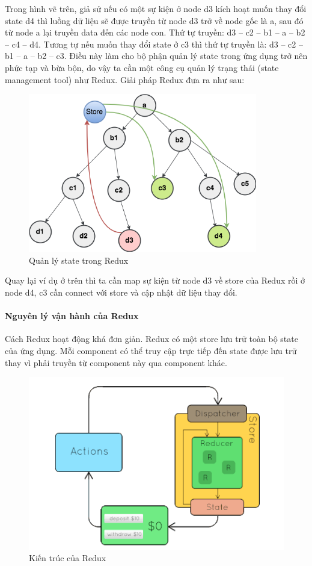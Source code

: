 Trong hình vẽ trên, giả sử nếu có một sự kiện ở node d3 kích
hoạt muốn thay đổi state d4 thì luồng dữ liệu sẽ được truyền
từ node d3 trở về node gốc là a, sau đó từ node a lại truyền data
đến các node con. Thứ tự truyền: d3 – c2 – b1 – a – b2 – c4 – d4.
Tương tự nếu muốn thay đổi state ở c3 thì thứ tự truyền là:
d3 – c2 – b1 – a – b2 – c3. Điều này làm cho bộ phận quản lý
state trong ứng dụng trở nên phức tạp và bừa bộn, do vậy ta
cần một công cụ quản lý trạng thái (state management tool)
như Redux. Giải pháp Redux đưa ra như sau:

\begin{figure}[H]
\centering
\includegraphics[width=10cm]{images/redux-solution.png}
\caption{Quản lý state trong Redux}
\end{figure}

Quay lại ví dụ ở trên thì ta cần map sự kiện từ node d3
về store của Redux rồi ở node d4, c3 cần connect với store
và cập nhật dữ liệu thay đổi.

\paragraph{Nguyên lý vận hành của Redux}
Cách Redux hoạt động khá đơn giản. Redux có một store lưu trữ
toàn bộ state của ứng dụng. Mỗi component có thể truy cập trực
tiếp đến state được lưu trữ thay vì phải truyền từ component
này qua component khác.

\begin{figure}[H]
\centering
\includegraphics[width=12cm]{images/redux-without-middleware.png}
\caption{Kiến trúc của Redux}
\end{figure}


